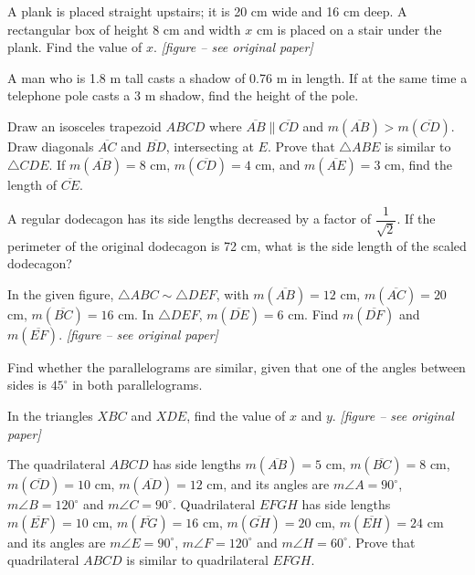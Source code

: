 \documentclass[11pt]{article}
\newcommand{\seg}[1]{\overline{#1}}
\begin{document}
\begin{wq}[start=287]

\item A plank is placed straight upstairs; it is 20 cm wide and 16 cm deep. A rectangular box of height 8 cm and width $x$ cm is placed on a stair under the plank. Find the value of $x$. \emph{[figure -- see original paper]}

\item A man who is 1.8 m tall casts a shadow of 0.76 m in length. If at the same time a telephone pole casts a 3 m shadow, find the height of the pole.

\item Draw an isosceles trapezoid $ABCD$ where $\seg{AB}\parallel \seg{CD}$ and $m(\seg{AB})>m(\seg{CD})$. Draw diagonals $\seg{AC}$ and $\seg{BD}$, intersecting at $E$. Prove that $\triangle ABE$ is similar to $\triangle CDE$. If $m(\seg{AB})=8$ cm, $m(\seg{CD})=4$ cm, and $m(\seg{AE})=3$ cm, find the length of $\seg{CE}$.

\item A regular dodecagon has its side lengths decreased by a factor of $\dfrac{1}{\sqrt{2}}$. If the perimeter of the original dodecagon is 72 cm, what is the side length of the scaled dodecagon?

\item In the given figure, $\triangle ABC \sim \triangle DEF$, with $m(\seg{AB})=12$ cm, $m(\seg{AC})=20$ cm, $m(\seg{BC})=16$ cm. In $\triangle DEF$, $m(\seg{DE})=6$ cm. Find $m(\seg{DF})$ and $m(\seg{EF})$. \emph{[figure -- see original paper]}

\item Find whether the parallelograms are similar, given that one of the angles between sides is $45^{\circ}$ in both parallelograms.

\item In the triangles $XBC$ and $XDE$, find the value of $x$ and $y$. \emph{[figure -- see original paper]}

\item The quadrilateral $ABCD$ has side lengths $m(\seg{AB})=5$ cm, $m(\seg{BC})=8$ cm, $m(\seg{CD})=10$ cm, $m(\seg{AD})=12$ cm, and its angles are $m\angle A=90^{\circ}$, $m\angle B=120^{\circ}$ and $m\angle C=90^{\circ}$. Quadrilateral $EFGH$ has side lengths $m(\seg{EF})=10$ cm, $m(\seg{FG})=16$ cm, $m(\seg{GH})=20$ cm, $m(\seg{EH})=24$ cm and its angles are $m\angle E=90^{\circ}$, $m\angle F=120^{\circ}$ and $m\angle H=60^{\circ}$. Prove that quadrilateral $ABCD$ is similar to quadrilateral $EFGH$.


\end{wq}
\end{document}
